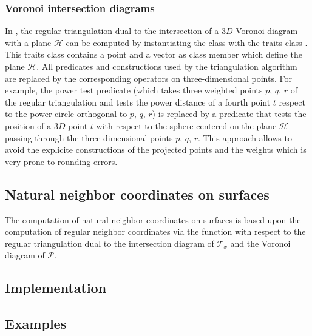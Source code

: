 \subsubsection{Voronoi intersection diagrams}




In \cgal, the regular triangulation dual to the intersection of a $3D$
Voronoi diagram with a plane $\mathcal{H}$ can be computed by
instantiating the  class with
the traits class . This traits
class contains a point and a vector as class member which define the
plane $\mathcal{H}$. All predicates and constructions used by the
triangulation algorithm are replaced by the corresponding operators on
three-dimensional points. For example, the power test predicate (which
takes three weighted points $p$, $q$, $r$ of the regular triangulation
and tests the power distance of a fourth point $t$ respect to the
power circle orthogonal to $p$, $q$, $r$) is replaced by a
 predicate that tests the
position of a $3D$ point $t$ with respect to the sphere centered on
the plane $\mathcal{H}$ passing through the three-dimensional points
$p$, $q$, $r$.  This approach allows to avoid the explicite
constructions of the projected points and the weights which is very
prone to rounding errors.

\subsection{Natural neighbor coordinates on surfaces}

The computation of natural neighbor coordinates on surfaces is based
upon the computation of regular neighbor coordinates via the function
 with respect to the regular
triangulation dual to the intersection diagram of $\mathcal{T}_x$ and
the Voronoi diagram of $\mathcal{P}$.


\subsection{Implementation}

\subsection{Examples}
